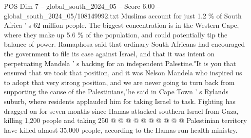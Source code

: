 \begin{textsample}{POS Dim 7 – global\_south\_2024\_05 – Score 6.00 – global\_south\_2024\_05/108149992.txt}
Muslims account for just 1.2 \% of South Africa ' s 62 million people.
The biggest concentration is in the Western Cape, where they make up 5.6 \% of the population, and could potentially tip the balance of power.
Ramaphosa said that ordinary South Africans had encouraged the government to file its case against Israel, and that it was intent on perpetuating Mandela ' s backing for an independent Palestine."It is you that ensured that we took that position, and it was Nelson Mandela who inspired us to adopt that very strong position, and we are never going to turn back from supporting the cause of the Palestinians,"he said in Cape Town ' s Rylands suburb, where residents applauded him for taking Israel to task.
Fighting has dragged on for seven months since Hamas attacked southern Israel from Gaza, killing 1,200 people and taking 250 @ @ @ @ @ @ @ @ @ @ Palestinian territory have killed almost 35,000 people, according to the Hamas-run health ministry.

\end{textsample}
